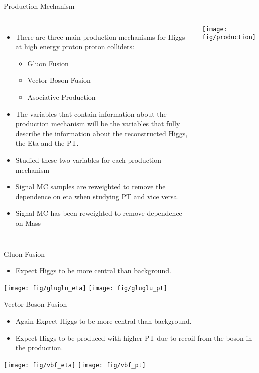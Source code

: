 \documentclass[t, 8pt]{beamer}
\begin{document}
\begin{frame}{Production Mechanism}
  \begin{columns}[c]
  \begin{itemize}  
    \item There are three main production mechanisms for Higgs at high energy
    proton proton colliders:
    \begin{itemize}  
      \item Gluon Fusion
      \item Vector Boson Fusion
      \item Asociative Production
    \end{itemize}
    \item The variables that contain information about the production mechanism will be
    the variables that fully describe the information about the reconstructed Higgs,
    the Eta and the PT.  
    \item Studied these two variables for each production mechanism
    \item Signal MC samples are reweighted to remove the dependence on eta when
    studying PT and vice versa.
    \item Signal MC has been reweighted to remove dependence on Mass
  \end{itemize}
    \texttt{[image: fig/production]}
  \end{columns}
\end{frame}

\begin{frame}{Gluon Fusion}
  \begin{itemize}  
    \item Expect Higgs to be more central than background. 
  \end{itemize}
    \begin{center}
    \texttt{[image: fig/gluglu\_eta]}
    \texttt{[image: fig/gluglu\_pt]}
    \end{center}
\end{frame}

\begin{frame}{Vector Boson Fusion}
  \begin{itemize}  
    \item Again Expect Higgs to be more central than background. 
    \item Expect Higgs to be produced with higher PT due to recoil from the
    boson in the production.
  \end{itemize}
    \begin{center}
    \texttt{[image: fig/vbf\_eta]}
    \texttt{[image: fig/vbf\_pt]}
    \end{center}
\end{frame}
\end{document}
